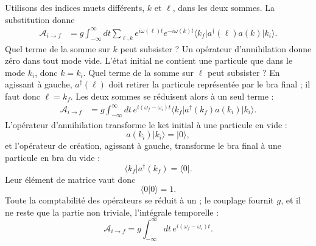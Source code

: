 Utilisons des indices muets différents, \(k\) et \(\ell\), dans les deux sommes. La substitution donne
\begin{align}
\mathcal A_{i\to f}
&=g\int_{-\infty}^{\infty}dt
\sum_{\ell,k}
e^{i\omega(\ell)t}e^{-i\omega(k)t}
\langle k_f\rvert a^\dagger(\ell)a(k)\lvert k_i\rangle.
\end{align}
Quel terme de la somme sur \(k\) peut subsister ? Un opérateur d’annihilation donne zéro dans tout mode vide. L’état initial ne contient une particule que dans le mode \(k_i\), donc \(k=k_i\). Quel terme de la somme sur \(\ell\) peut subsister ? En agissant à gauche, \(a^\dagger(\ell)\) doit retirer la particule représentée par le bra final ; il faut donc \(\ell=k_f\). Les deux sommes se réduisent alors à un seul terme :
\begin{align}
\mathcal A_{i\to f}
&=g\int_{-\infty}^{\infty}dt\,
e^{i(\omega_f-\omega_i)t}
\langle k_f\rvert a^\dagger(k_f)a(k_i)\lvert k_i\rangle.
\end{align}
L’opérateur d’annihilation transforme le ket initial à une particule en vide :
\begin{equation}
a(k_i)\lvert k_i\rangle=\lvert0\rangle,
\end{equation}
et l’opérateur de création, agissant à gauche, transforme le bra final à une particule en bra du vide :
\begin{equation}
\langle k_f\rvert a^\dagger(k_f)=\langle0\rvert.
\end{equation}
Leur élément de matrice vaut donc
\begin{equation}
\langle0\vert0\rangle=1.
\end{equation}
Toute la comptabilité des opérateurs se réduit à un ; le couplage fournit \(g\), et il ne reste que la partie non triviale, l’intégrale temporelle :
\begin{equation}
\mathcal A_{i\to f}
=g\int_{-\infty}^{\infty}dt\,
e^{i(\omega_f-\omega_i)t}.
\end{equation}


